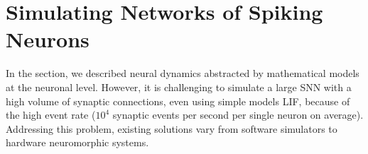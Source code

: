 \section{Simulating Networks of Spiking Neurons}
\label{sec:snn_sim}
In the \DIFdelbegin {}\DIFdelend \DIFaddbegin {}\DIFaddend section, we \DIFdelbegin {}\DIFdelend described neural dynamics \DIFdelbegin {}\DIFdelend \DIFaddbegin {}\DIFaddend abstracted by mathematical models at the neuronal level.
However, it is challenging to simulate a large SNN with a high volume of synaptic connections, even using simple models \DIFdelbegin {}\DIFdelend \DIFaddbegin {}\DIFaddend LIF, because of the high event rate ($10^4$ synaptic events per second per single neuron on average).
Addressing this problem, existing solutions vary from software simulators to hardware neuromorphic systems.


